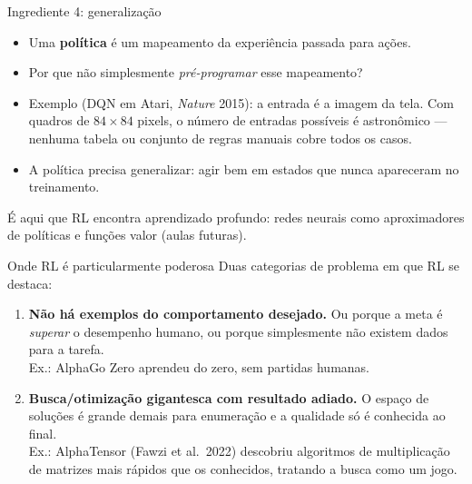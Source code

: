 \documentclass[aspectratio=169, 11pt]{beamer}
\begin{document}
\begin{frame}{Ingrediente 4: generalização}
  \begin{itemize}
    \item Uma \textbf{política} é um mapeamento da experiência passada para
          ações.
    \item Por que não simplesmente \emph{pré-programar} esse mapeamento?
    \item Exemplo (DQN em Atari, \emph{Nature} 2015): a entrada é a imagem
          da tela. Com quadros de $84\times 84$ pixels, o número de
          entradas possíveis é astronômico — nenhuma tabela ou conjunto de
          regras manuais cobre todos os casos.
    \item A política precisa \alert{generalizar}: agir bem em estados que
          nunca apareceram no treinamento.
  \end{itemize}

  \medskip
  {\small\color{rlCinza} É aqui que RL encontra aprendizado profundo:
  redes neurais como aproximadores de políticas e funções valor
  (aulas futuras).}
\end{frame}

\begin{frame}{Onde RL é particularmente poderosa}
  Duas categorias de problema em que RL se destaca:

  \medskip
  \begin{enumerate}
    \item \textbf{Não há exemplos do comportamento desejado.}
          Ou porque a meta é \emph{superar} o desempenho humano, ou porque
          simplesmente não existem dados para a tarefa.
          \\ {\small\color{rlCinza} Ex.: AlphaGo Zero aprendeu do zero, sem
          partidas humanas.}
    \item \textbf{Busca/otimização gigantesca com resultado adiado.}
          O espaço de soluções é grande demais para enumeração e a
          qualidade só é conhecida ao final.
          \\ {\small\color{rlCinza} Ex.: AlphaTensor (Fawzi et al.\ 2022)
          descobriu algoritmos de multiplicação de matrizes mais rápidos
          que os conhecidos, tratando a busca como um jogo.}
  \end{enumerate}
\end{frame}
\end{document}
